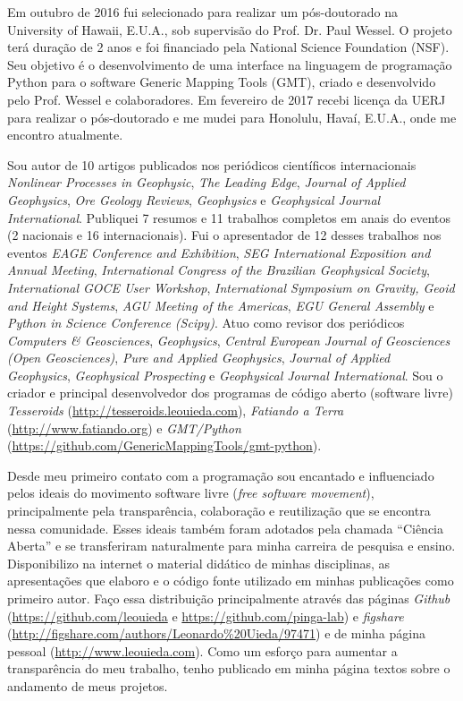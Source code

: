 Em outubro de 2016 fui selecionado para realizar um pós-doutorado na University
of Hawaii, E.U.A., sob supervisão do Prof. Dr. Paul Wessel.
O projeto terá duração de 2 anos e foi financiado pela National Science
Foundation (NSF).
Seu objetivo é o desenvolvimento de uma interface na linguagem de programação
Python para o software Generic Mapping Tools (GMT), criado e desenvolvido pelo
Prof. Wessel e colaboradores.
Em fevereiro de 2017 recebi licença da UERJ para realizar o pós-doutorado e me
mudei para Honolulu, Havaí, E.U.A., onde me encontro atualmente.

Sou autor de 10 artigos publicados nos periódicos científicos internacionais
{\em Nonlinear Processes in Geophysic},
{\em The Leading Edge},
{\em Journal of Applied Geophysics},
{\em Ore Geology Reviews},
{\em Geophysics} e
{\em Geophysical Journal International}.
Publiquei 7 resumos e 11 trabalhos completos em anais do eventos (2 nacionais e
16 internacionais).
Fui o apresentador de 12 desses trabalhos nos eventos
{\em EAGE Conference and Exhibition},
{\em SEG International Exposition and Annual Meeting},
{\em International Congress of the Brazilian Geophysical Society},
{\em International GOCE User Workshop},
{\em International Symposium on Gravity, Geoid and Height Systems},
{\em AGU Meeting of the Americas},
{\em EGU General Assembly} e
{\em Python in Science Conference (Scipy)}.
Atuo como revisor dos periódicos
{\em Computers \& Geosciences},
{\em Geophysics},
{\em Central European Journal of Geosciences (Open Geosciences)},
{\em Pure and Applied Geophysics},
{\em Journal of Applied Geophysics},
{\em Geophysical Prospecting}
e {\em Geophysical Journal International}.
Sou o criador e principal desenvolvedor dos programas de código aberto
(software livre)
{\em Tesseroids} (\url{http://tesseroids.leouieda.com}),
{\em Fatiando a Terra} (\url{http://www.fatiando.org}) e
{\em GMT/Python} (\url{https://github.com/GenericMappingTools/gmt-python}).

Desde meu primeiro contato com a programação sou encantado e influenciado pelos
ideais do movimento software livre ({\em free software movement}),
principalmente pela transparência, colaboração e reutilização que se encontra
nessa comunidade.
Esses ideais também foram adotados pela chamada ``Ciência Aberta'' e se
transferiram naturalmente para minha carreira de pesquisa e ensino.
Disponibilizo na internet o material didático de minhas disciplinas, as
apresentações que elaboro e o código fonte utilizado em minhas publicações como
primeiro autor.
Faço essa distribuição principalmente através das páginas
{\em Github} (\url{https://github.com/leouieda} e
\url{https://github.com/pinga-lab}) e
{\em figshare} (\url{http://figshare.com/authors/Leonardo%20Uieda/97471})
e de minha página pessoal (\url{http://www.leouieda.com}).
Como um esforço para aumentar a transparência do meu trabalho, tenho publicado
em minha página textos sobre o andamento de meus projetos.

